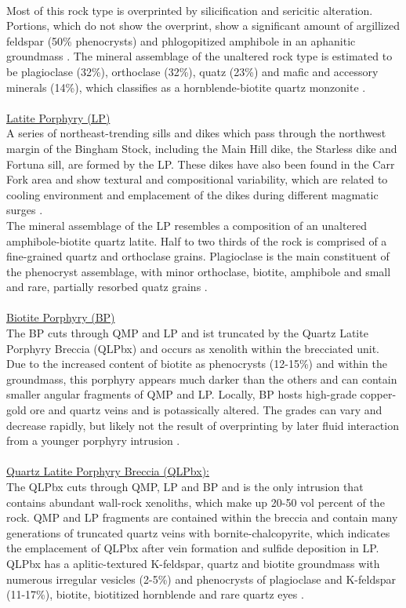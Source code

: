 \documentclass[a4paper,11pt,titlepage]{article}
\begin{document}
\\ Most of this rock type is overprinted by silicification and sericitic alteration. Portions, which do not show the overprint, show a significant amount of argillized feldspar (50\% phenocrysts) and phlogopitized amphibole in an aphanitic groundmass . The mineral assemblage of the unaltered rock type is estimated to be plagioclase (32\%), orthoclase (32\%), quatz (23\%) and mafic and accessory minerals (14\%), which classifies as a hornblende-biotite quartz monzonite \citep{Lanier1978}.
\\
\\\underline{Latite Porphyry (LP)}
\\ A series of northeast-trending sills and dikes which pass through the northwest margin of the Bingham Stock, including the Main Hill dike, the Starless dike and Fortuna sill, are formed by the LP. These dikes have also been found in the Carr Fork area and show textural and compositional variability, which are related to cooling environment and emplacement of the dikes during different magmatic surges \citep{Lanier1978}.
\\ The mineral assemblage of the LP resembles a composition of an unaltered amphibole-biotite quartz latite. Half to two thirds of the rock is comprised of a fine-grained quartz and orthoclase grains. Plagioclase is the main constituent of the phenocryst assemblage, with minor orthoclase, biotite, amphibole and small and rare, partially resorbed quatz grains \citep{Lanier1978}.
\\
\\\underline{Biotite Porphyry (BP)}
\\ The BP cuts through QMP and LP and ist truncated by the Quartz Latite Porphyry Breccia (QLPbx) and occurs as xenolith within the brecciated unit. Due to the increased content of biotite as phenocrysts (12-15\%) and within the groundmass, this porphyry appears much darker than the others and can contain smaller angular fragments of QMP and LP. Locally, BP hosts high-grade copper-gold ore and quartz veins and is potassically altered. The grades can vary and decrease rapidly, but likely not the result of overprinting by later fluid interaction from a younger porphyry intrusion \citep{Redmond2010a}.
\\
\\\underline{Quartz Latite Porphyry Breccia (QLPbx):}
\\ The QLPbx cuts through QMP, LP and BP and is the only intrusion that contains abundant wall-rock xenoliths, which make up 20-50 vol percent of the rock. QMP and LP fragments are contained within the breccia and contain many generations of truncated quartz veins with bornite-chalcopyrite, which indicates the emplacement of QLPbx after vein formation and sulfide deposition in LP. QLPbx has a aplitic-textured K-feldspar, quartz and biotite groundmass with numerous irregular vesicles (2-5\%) and phenocrysts of plagioclase and K-feldspar (11-17\%), biotite, biotitized hornblende and rare quartz eyes \citep{Redmond2010a}.
\end{document}
